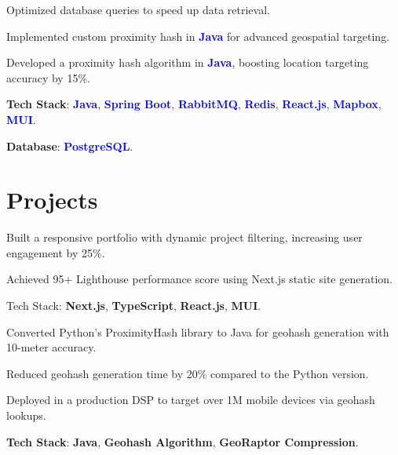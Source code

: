 \documentclass[]{azhagu-swe-resume-openfont}
\begin{document}
\begin{minipage}[t]{0.66\textwidth}
\begin{tightemize}
    \item Optimized database queries to speed up data retrieval.
    \item Implemented custom proximity hash in \textbf{\textcolor{blue}{Java}} for advanced geospatial targeting.
    \item Developed a proximity hash algorithm in \textbf{\textcolor{blue}{Java}}, boosting location targeting accuracy by 15\%.
    \item \textbf{Tech Stack}: \textbf{\textcolor{blue}{Java}}, \textbf{\textcolor{blue}{Spring Boot}}, \textbf{\textcolor{blue}{RabbitMQ}}, \textbf{\textcolor{blue}{Redis}}, \textbf{\textcolor{blue}{React.js}}, \textbf{\textcolor{blue}{Mapbox}}, \textbf{\textcolor{blue}{MUI}}.
    \item \textbf{Database}: \textbf{\textcolor{blue}{PostgreSQL}}.
\end{tightemize}
\sectionsep



\section{Projects}

\begin{tightemize}
\item Built a responsive portfolio with dynamic project filtering, increasing user engagement by 25\%.  
\item Achieved 95+ Lighthouse performance score using Next.js static site generation.  
\item Tech Stack: \textbf{Next.js}, \textbf{TypeScript}, \textbf{React.js}, \textbf{MUI}.  
\end{tightemize}
\sectionsep

\begin{tightemize}
    \item Converted Python's ProximityHash library to Java for geohash generation with 10-meter accuracy.
    \item Reduced geohash generation time by 20\% compared to the Python version.
    \item Deployed in a production DSP to target over 1M mobile devices via geohash lookups.
    \item \textbf{Tech Stack}: \textbf{Java}, \textbf{Geohash Algorithm}, \textbf{GeoRaptor Compression}.
\end{tightemize}
\sectionsep

\end{minipage} 
\end{document}
